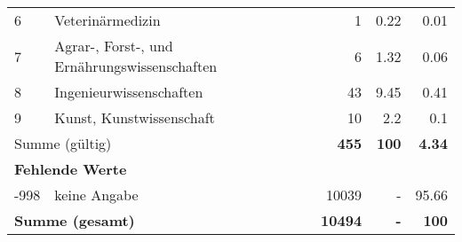 \begin{longtable}{lXrrr}
     6 &
     \multicolumn{1}{X}{ Veterinärmedizin   } &


       \num{1} &
       \num[round-mode=places,round-precision=2]{0,22} &
         \num[round-mode=places,round-precision=2]{0,01} \\

     7 &
     \multicolumn{1}{X}{ Agrar-, Forst-, und Ernährungswissenschaften   } &


       \num{6} &
       \num[round-mode=places,round-precision=2]{1,32} &
         \num[round-mode=places,round-precision=2]{0,06} \\

     8 &
     \multicolumn{1}{X}{ Ingenieurwissenschaften   } &


       \num{43} &
       \num[round-mode=places,round-precision=2]{9,45} &
         \num[round-mode=places,round-precision=2]{0,41} \\

     9 &
     \multicolumn{1}{X}{ Kunst, Kunstwissenschaft   } &


       \num{10} &
       \num[round-mode=places,round-precision=2]{2,2} &
         \num[round-mode=places,round-precision=2]{0,1} \\
     \midrule
     \multicolumn{2}{l}{Summe (gültig)} &
       \textbf{\num{455}} &
     \textbf{100} &
       \textbf{\num[round-mode=places,round-precision=2]{4,34}} \\
     \multicolumn{5}{l}{\textbf{Fehlende Werte}}\\
       -998 &
       keine Angabe &
         \num{10039} &
        - &
         \num[round-mode=places,round-precision=2]{95,66} \\
     \midrule
     \multicolumn{2}{l}{\textbf{Summe (gesamt)}} &
          \textbf{\num{10494}} &
        \textbf{-} &
        \textbf{100} \\
     \bottomrule
     \end{longtable}
     
